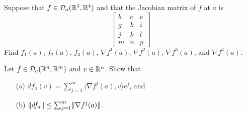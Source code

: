 \begin{prob}  Suppose that $f \in \mathcal{D}_a(\mathbb{R}^3,\mathbb{R}^4)$ and that the Jacobian matrix of $f$ at
$a$ is
  \[ \begin{bmatrix}  b & c & e \\
                      g & h & i \\
                      j & k & l \\
                      m & n & p
     \end{bmatrix} \]
Find $f_1(a)$, $f_2(a)$, $f_3(a)$, $\nabla f^1(a)$, $\nabla f^2(a)$, $\nabla f^3(a)$, and
$\nabla f^4(a)$.
\end{prob}

\begin{prob}  Let $f \in \mathcal{D}_a(\mathbb{R}^n,\mathbb{R}^m)$ and $v \in \mathbb{R}^n$.  Show that
 \begin{enumerate}
  \item[(a)] $df_a(v) = \sum_{j=1}^m \langle \nabla f^j(a),v \rangle e^j$, and
  \item[(b)] $\lVert df_a\rVert \le \sum_{j=1}^m \lVert\nabla f^j(a)\rVert$.
 \end{enumerate}
\end{prob}






